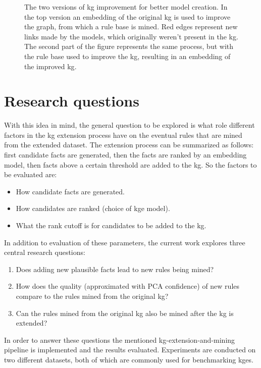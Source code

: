 \begin{figure}[htp]
    \centering
    
    \caption[Figure representing the process.]{The two versions of \gls{kg} improvement for better model creation. In the top version an embedding of the original \gls{kg} is used to improve the graph, from which a rule base is mined. Red edges represent new links made by the models, which originally weren't present in the \gls{kg}. The second part of the figure represents the same process, but with the rule base used to improve the \gls{kg}, resulting in an embedding of the improved \gls{kg}.}
    \label{rule_based_and_embedding}
\end{figure}

\section{Research questions}
With this idea in mind, the general question to be explored is what role different factors in the \gls{kg} extension process have on the eventual rules that are mined from the extended dataset. The extension process can be summarized as follows: first candidate facts are generated, then the facts are ranked by an embedding model, then facts above a certain threshold are added to the \gls{kg}. So the factors to be evaluated are:
\begin{itemize}
    \item How candidate facts are generated.
    \item How candidates are ranked (choice of \gls{kge} model).
    \item What the rank cutoff is for candidates to be added to the \gls{kg}.
\end{itemize}

In addition to evaluation of these parameters, the current work explores three central research questions:
\begin{enumerate}
    \item Does adding new plausible facts lead to new rules being mined?
    \item How does the quality (approximated with PCA confidence) of new rules compare to the rules mined from the original \gls{kg}?
    \item Can the rules mined from the original \gls{kg} also be mined after the \gls{kg} is extended?
\end{enumerate}

In order to answer these questions the mentioned \gls{kg}-extension-and-mining pipeline is implemented and the results evaluated. Experiments are conducted on two different datasets, both of which are commonly used for benchmarking \glspl{kge}.

